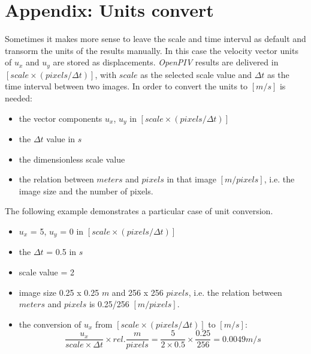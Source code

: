 \clearpage
\appendix
\section*{Appendix: Units convert}\label{Units}

Sometimes it makes more sense to leave the scale and time interval as default and transorm the units of the results manually. In this case the velocity vector units of $u_{x}$ and $u_{y}$ are stored as displacements. \emph{OpenPIV} results are delivered in $[scale\times(pixels/\Delta t)]$, 
with $scale$ as the selected scale value and $\Delta t$ as the time interval between two images. 
In order to convert the units to $[m/s]$ is needed:

\begin{itemize}
      	\item the vector components $u_{x}$, $u_{y}$ in $[scale\times(pixels/\Delta t)]$
      	\item the $\Delta t$ value in $s$
      	\item the dimensionless scale value
	\item the relation between $meters$ and $pixels$ in that image $[m/pixels]$, i.e. the 
	      image size and the number of pixels.
\end{itemize}

The following example demonstrates a particular case of unit conversion.

\begin{itemize}
      	\item $u_{x}$ = 5, $u_{y}$ = 0 in $[scale\times(pixels/\Delta t)]$
      	\item the $\Delta t$ = 0.5 in $s$
      	\item scale value = 2
        \item image size 0.25 x 0.25 $m$ and 256 x 256 $pixels$, i.e. the relation between 
	      $meters$ and $pixels$ is 0.25/256 $[m/pixels]$.
    	\item the conversion of $u_{x}$ from $[scale\times(pixels/\Delta t)]$ to $[m/s]$:
        \[
         \frac{u_{x}}{scale\times\Delta t}\times rel.\frac{m}{pixels}=\frac{5}{2\times0.5}\times 
         \frac{0.25}{256}=0.0049 m/s
        \]
\end{itemize}
